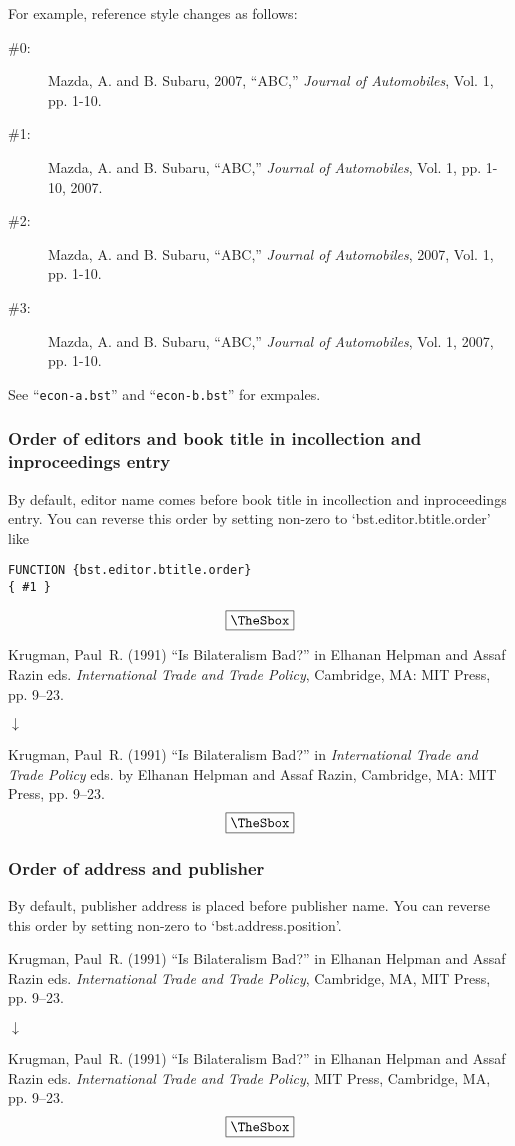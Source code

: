 \documentclass[10pt]{article}
\newenvironment{Frame}%
{\setlength{\fboxsep}{15pt}
\setlength{\mylength}{\linewidth}%
\addtolength{\mylength}{-2\fboxsep}%
\addtolength{\mylength}{-2\fboxrule}%
\Sbox
\minipage{\mylength}%
\setlength{\abovedisplayskip}{0pt}%
\setlength{\belowdisplayskip}{0pt}%
}%
{\endminipage\endSbox
\[\fbox{\TheSbox}\]}
\begin{document}
For example, reference style changes as follows:
\begin{description}
 \item[\#0: ] Mazda, A. and B. Subaru, 2007, ``ABC,'' \textit{Journal of Automobiles}, Vol. 1, pp. 1-10.
 \item[\#1: ] Mazda, A. and B. Subaru, ``ABC,'' \textit{Journal of Automobiles}, Vol. 1, pp. 1-10, 2007.
 \item[\#2: ] Mazda, A. and B. Subaru, ``ABC,'' \textit{Journal of Automobiles}, 2007, Vol. 1, pp. 1-10.
 \item[\#3: ] Mazda, A. and B. Subaru, ``ABC,'' \textit{Journal of Automobiles}, Vol. 1, 2007, pp. 1-10.
\end{description}

See ``\texttt{econ-a.bst}'' and ``\texttt{econ-b.bst}'' for exmpales.


\subsubsection{Order of editors and book title in incollection and inproceedings entry}

By default, editor name comes before book title in incollection and
inproceedings entry. You can reverse this order by
setting non-zero to `bst.editor.btitle.order' like
\begin{Frame}
\begin{verbatim}
FUNCTION {bst.editor.btitle.order}
{ #1 }
\end{verbatim}
\end{Frame}


\begin{Frame}
Krugman, Paul~R. (1991) ``Is Bilateralism Bad?'' in Elhanan Helpman and Assaf
  Razin eds.  {\it International Trade and Trade Policy}, Cambridge, MA: MIT
  Press, pp. 9--23.
\begin{center}
 $\downarrow$
\end{center} 
Krugman, Paul~R. (1991) ``Is Bilateralism Bad?'' in  {\it International Trade
and Trade Policy}  eds. by Elhanan Helpman and Assaf Razin, Cambridge, MA:
MIT Press, pp. 9--23.
\end{Frame}

\subsubsection{Order of address and publisher}

By default, publisher address is placed before publisher name.  You can
reverse this order by setting non-zero to `bst.address.position'.
\begin{Frame}
Krugman, Paul~R. (1991) ``Is Bilateralism Bad?'' in Elhanan Helpman and
  Assaf Razin eds.  {\it International Trade and Trade Policy},
  Cambridge, MA, MIT Press, pp. 9--23.
\begin{center}
 $\downarrow$
\end{center} 
Krugman, Paul~R. (1991) ``Is Bilateralism Bad?'' in Elhanan Helpman and Assaf
  Razin eds.   {\it International Trade and Trade Policy}, MIT Press,
  Cambridge, MA, pp. 9--23.
\end{Frame}
\end{document}
